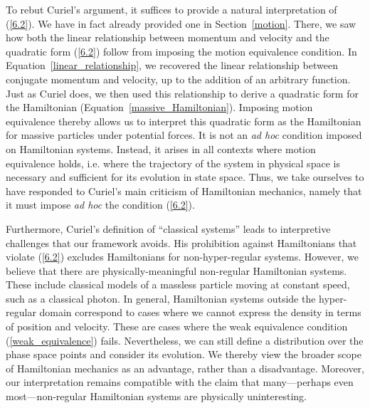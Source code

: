 \documentclass[12pt, twoside]{article}
\begin{document}
To rebut Curiel's argument, it suffices to provide a natural interpretation of (\ref{6.2}). We have in fact already provided one in Section~\ref{motion}. There, we saw how both the linear relationship between momentum and velocity and the quadratic form (\ref{6.2}) follow from imposing the motion equivalence condition. In Equation~\ref{linear_relationship}, we recovered the linear relationship between conjugate momentum and velocity, up to the addition of an arbitrary function. Just as Curiel does, we then used this relationship to derive a quadratic form for the Hamiltonian (Equation~\ref{massive_Hamiltonian}). Imposing motion equivalence thereby allows us to interpret this quadratic form as the Hamiltonian for massive particles under potential forces. It is not an \textit{ad hoc} condition imposed on Hamiltonian systems. Instead, it arises in all contexts where motion equivalence holds, i.e. where the trajectory of the system in physical space is necessary and sufficient for its evolution in state space. Thus, we take ourselves to have responded to Curiel's main criticism of Hamiltonian mechanics, namely that it must impose \textit{ad hoc} the condition (\ref{6.2}). 

Furthermore, Curiel's definition of ``classical systems'' leads to interpretive challenges that our framework avoids. His prohibition against Hamiltonians that violate (\ref{6.2}) excludes Hamiltonians for non-hyper-regular systems. However, we believe that there are physically-meaningful non-regular Hamiltonian systems. These include classical models of a massless particle moving at constant speed, such as a classical photon. In general, Hamiltonian systems outside the hyper-regular domain correspond to cases where we cannot express the density in terms of position and velocity. These are cases where the weak equivalence condition (\ref{weak_equivalence}) fails. Nevertheless, we can still define a distribution over the phase space points and consider its evolution. We thereby view the broader scope of Hamiltonian mechanics as an advantage, rather than a disadvantage. Moreover, our interpretation remains compatible with the claim that many---perhaps even most---non-regular Hamiltonian systems are physically uninteresting.
\end{document}
